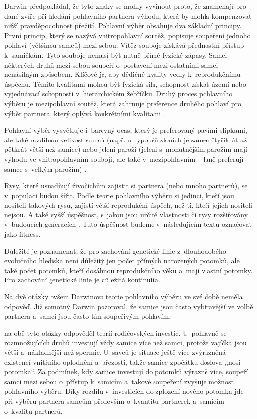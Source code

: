 \documentclass[a4paper, 12pt, notitlepage, oneside, numbers=noenddot]{report}
\begin{document}
Darwin předpokládal, že tyto znaky se mohly vyvinout proto, že
znamenají pro dané zvíře při hledání pohlavního partnera výhodu, která
by mohla kompenzovat nižší pravděpodobnost přežití.  Pohlavní výběr
obsahuje dva základní principy.  První princip, který se nazývá
vnitropohlavní soutěž, popisuje soupeření jednoho pohlaví (většinou
samců) mezi sebou.  Vítěz souboje získává přednostní přístup
k~samičkám.  Tyto souboje nemusí být nutně přímé fyzické zápasy.
Samci některých druhů mezi sebou soupeří o~postavení mezi ostatními
samci nenásilným způsobem.  Klíčové je, aby dědičné kvality vedly
k~reprodukčnímu úspěchu.  Těmito kvalitami mohou být fyzická síla,
schopnost získat území nebo vyjednávací schopnosti v~hierarchickém
žebříčku.  Druhý proces pohlavního výběru je mezipohlavní soutěž,
která zahrnuje preference druhého po\-hla\-ví pro výběr partnera,
který oplývá konkrétními kvalitami \citep{Buss2007}.

Pohlavní výběr vysvětluje i~barevný ocas, který je preferovaný pavími
slípkami, ale také rozdílnou velikost samců (např. u rypoušů sloních
je samec čtyřikrát až pětkrát větší než samice) nebo jelení paroží
(jeleni s~mohutnějším parožím mají výhodu ve vnitropohlavním souboji,
ale také v~mezipohlavním -- laně preferují samce s~velkým parožím)
\citep{Buss2007}.

Rysy, které usnadňují živočichům zajistit si partnera (nebo mnoho
partnerů), se v~po\-pu\-laci budou šířit.  Podle teorie pohlavního
výběru si jedinci, kteří jsou nositeli takových rysů, zajistí větší
reprodukční úspěch, než ti, kteří jejich nositeli nejsou.  A také
vyšší úspěšnost, s~jakou jsou určité vlastnosti či rysy rozšiřovány
v~budoucích generacích \citep{BarrettDunbarLycett2007}.  Tuto
úspěšnost budeme v~následujícím textu označovat jako fitness.

Důležité je poznamenat, že pro zachování genetické linie
z~dlouhodobého evolučního hlediska není důležitý jen počet přímých
narozených potomků, ale také počet potomků, kteří dosáhnou
reprodukčního věku a~mají vlastní potomky. Pro zachování genetické
linie je důležitá kontinuita.

Na dvě otázky ovšem Darwinova teorie pohlavního výběru ve své době
neměla odpověď.  Již samotný Darwin pozoroval, že samice jsou často
vybíravější ve volbě partnera a~samci jsou často tím soupeřivým
pohlavím.

\citet{Trivers1972} na obě tyto otázky odpověděl teorií rodičovských
investic.  U~pohlavně se rozmnožujících druhů investují vždy samice
více než samci, protože vajíčka jsou větší a~nákladnější než spermie.
U~savců je situace ještě více zvýrazněná existencí vnitřního oplodnění
a~březostí, takže samice zpočátku doslova ,,nosí potomka``.  Za podmínek,
kdy samice investují do potomků výrazně více, soupeří samci mezi sebou
o~přístup k~samicím a~takové soupeření zvyšuje možnost pohlavního
výběru.  Díky rozdílu v~investicích do zplození nového potomka jde při
výběru partnera samcům především o~kvantitu partnerek a~samicím
o~kvalitu partnerů.
\end{document}
